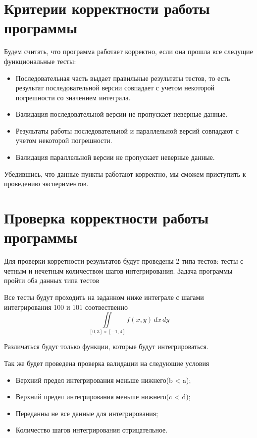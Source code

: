 \documentclass[12pt,a4paper]{article}
\begin{document}
\section*{Критерии корректности работы программы}

Будем считать, что программа работает корректно, если она прошла все следущие функциональные тесты:
\begin{itemize}
    \item Последовательная часть выдает правильные результаты тестов, то есть результат последовательной версии совпадает с учетом некоторой погрешности со значением интеграла.
    \item Валидация последовательной версии не пропускает неверные данные.
    \item Результаты работы последовательной и параллельной версий совпадают с учетом некоторой погрешности.
    \item Валидация параллельной версии не пропускает неверные данные.
\end{itemize}

Убедившись, что данные пункты работают корректно, мы сможем приступить к проведению экспериментов.

\section*{Проверка корректности работы программы}

Для проверки корретности результатов будут проведены 2 типа тестов: тесты с четным и нечетным количеством шагов интегрирования. Задача программы пройти оба данных типа тестов

Все тесты будут проходить на заданном ниже интеграле с шагами интегрирования 100 и 101 соотвественно
\[
\iint\limits_{[0, 3] \times [-1, 4]} f(x, y) \, dx \, dy
\]

Различаться будут только функции, которые будут интегрироваться.

Так же будет проведена проверка валидации на следующие условия
\begin{itemize}
    \item Верхний предел интегрирования меньше нижнего(b < a);
    \item Верхний предел интегрирования меньше нижнего(c < d);
    \item Переданны не все данные для интегрирования;
    \item Количество шагов интегрирования отрицательное.
\end{itemize}
\end{document}
